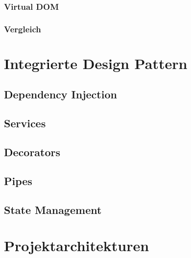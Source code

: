 \subsubsection{Virtual DOM}
\subsubsection{Vergleich}

\section{Integrierte Design Pattern}
\subsection{Dependency Injection}
\subsection{Services}
\subsection{Decorators}
\subsection{Pipes}
\subsection{State Management}

\section{Projektarchitekturen}